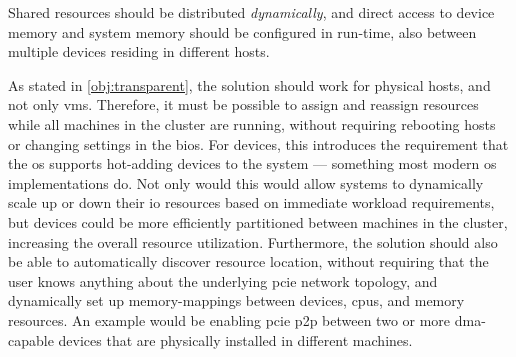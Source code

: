 \begin{objective}\label{obj:dynamic}
    Shared resources should be distributed \emph{dynamically}, and direct access to device memory and system memory should be configured in run-time, also between multiple devices residing in different hosts.
\end{objective}
As stated in \cref{obj:transparent}, the solution should work for physical hosts, and not only \glspl{vm}. Therefore, it must be possible to assign and reassign resources while all machines in the cluster are running, without requiring rebooting hosts or changing settings in the \gls{bios}.
For devices, this introduces the requirement that the \gls{os} supports hot-adding devices to the system --- something most modern \gls{os} implementations do.
Not only would this would allow systems to dynamically scale up or down their \gls{io} resources based on immediate workload requirements, but devices could be more efficiently partitioned between machines in the cluster, increasing the overall resource utilization. 
Furthermore, the solution should also be able to automatically discover resource location, without requiring that the user knows anything about the underlying \gls{pcie} network topology, and dynamically set up memory-mappings between devices, \glspl{cpu}, and memory resources. An example would be enabling \gls{pcie} \gls{p2p} between two or more \gls{dma}-capable devices that are physically installed in different machines.

